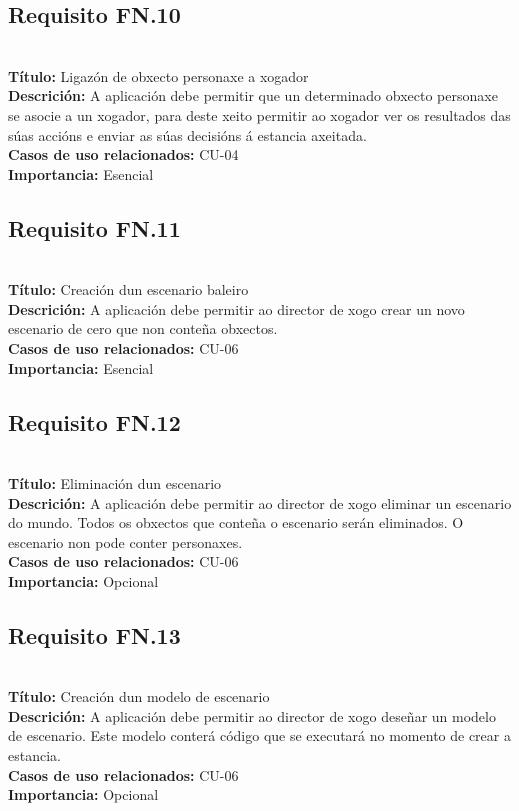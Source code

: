 \subsection{Requisito FN.10}~\\
{\bf Título:} Ligazón de obxecto personaxe a xogador\\
{\bf Descrición:} A aplicación debe permitir que un determinado obxecto
personaxe se asocie a un xogador, para deste xeito permitir ao xogador ver os
resultados das súas accións e enviar as súas decisións á estancia axeitada.\\
{\bf Casos de uso relacionados:} CU-04\\
{\bf Importancia:} Esencial

\subsection{Requisito FN.11}~\\
{\bf Título:} Creación dun escenario baleiro\\
{\bf Descrición:} A aplicación debe permitir ao director de xogo crear un novo
escenario de cero que non conteña obxectos.\\
{\bf Casos de uso relacionados:} CU-06\\
{\bf Importancia:} Esencial

\subsection{Requisito FN.12}~\\
{\bf Título:} Eliminación dun escenario\\
{\bf Descrición:} A aplicación debe permitir ao director de xogo eliminar un
escenario do mundo. Todos os obxectos que conteña o escenario serán eliminados.
O escenario non pode conter personaxes.\\
{\bf Casos de uso relacionados:} CU-06\\
{\bf Importancia:} Opcional

\subsection{Requisito FN.13}~\\
{\bf Título:} Creación dun modelo de escenario\\
{\bf Descrición:} A aplicación debe permitir ao director de xogo deseñar un
modelo de escenario. Este modelo conterá código que se executará no momento de
crear a estancia.\\
{\bf Casos de uso relacionados:} CU-06\\
{\bf Importancia:} Opcional

